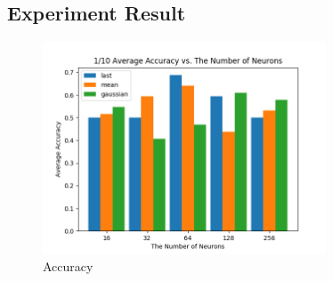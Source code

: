 \documentclass[draft,dvipsnames]{drexel-thesis}
\begin{document}
\begin{thesis}
\chapter{Experiment Result}


\begin{figure}[H]
    \centering
    \includegraphics[width=0.75\textwidth]{pictures/result_pictures/filtered_1_10_result.png}
    \caption{Accuracy}
    \label{fig:Accuracy}
\end{figure}



\end{thesis}
\end{document}
